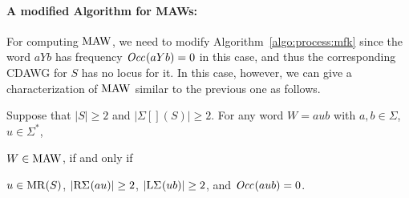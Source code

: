 \paragraph{A modified Algorithm for MAWs:} 
For computing $\MAW$, we need to modify  Algorithm~\ref{algo:process:mfk} since the word $aYb$ has frequency $\Occ[](aYb) = 0$ in this case, and thus the corresponding CDAWG for $S$ has no locus for it.
In this case, however, we can give a characterization of $\MAW$ similar to the previous one as follows. 




\begin{lemma}\label{lem:algo:chara:maw}
Suppose that $|S|\ge 2$ and $|\Sigma[](S)|\ge 2$. 
For any word $W = aub$ with $a,b\in\Sigma$,  $u\in\Sigma^*$, 
\begin{enumerate*}[(1)]
\item $W \in \MAW$, if and only if  
\item $u\in\MR(S)$, $|\RSigma[](au)| \ge 2$, $|\LSigma[](ub)| \ge 2$, and $\Occ[](aub) = 0$. 
\end{enumerate*}
\end{lemma}






